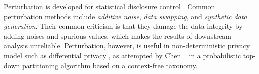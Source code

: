 Perturbation is developed for statistical disclosure control
\cite{FungWCY10:Survey}. Common perturbation methods include {\em additive
noise}, {\em data swapping}, and {\em synthetic data generation}. Their
common criticism is that they damage the data integrity by adding noises and
spurious values, which makes the results of downstream analysis unreliable.
Perturbation, however, is useful in non-deterministic privacy model such as
differential privacy \cite{Dwork08:diff:survey}, as
attempted by Chen \etal~ \cite{ChenMFDX11:Diff} in a probabilistic top-down
partitioning algorithm based on a context-free taxonomy.
%

